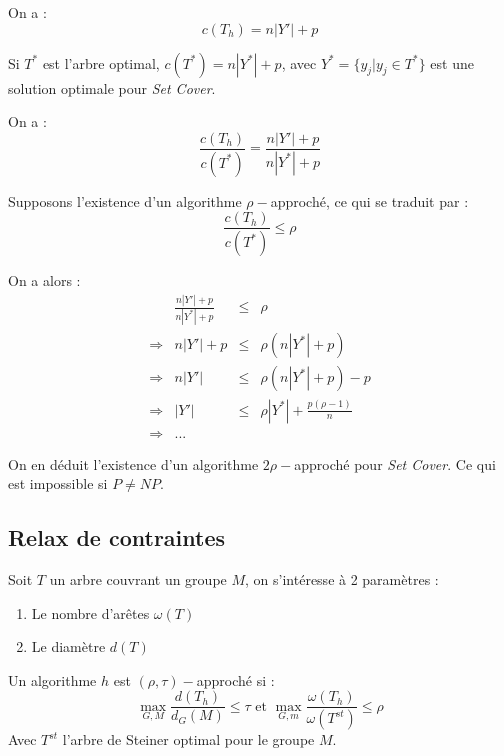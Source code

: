 \documentclass[a4paper,11pt]{thesis}
\begin{document}
On a : \begin{displaymath}
    c(T_h) = n|Y'| + p
\end{displaymath}

Si $T^*$ est l'arbre optimal, $c(T^*) = n|Y^*| + p$, avec $Y^* = \{y_j | y_j \in T^* \}$ est une
solution optimale pour \emph{Set Cover}.

On a : \begin{displaymath}
    \frac{c(T_h)}{c(T^*)} = \frac{n|Y'| + p}{n|Y^*| + p}
\end{displaymath}

Supposons l'existence d'un algorithme $\rho-$approché, ce qui se traduit par : 
\begin{displaymath}
    \frac{c(T_h)}{c(T^*)} \leq \rho
\end{displaymath}

On a alors : 
\begin{displaymath}
    \begin{array}{rrcl}
        & \displaystyle \frac{n|Y'| + p}{n|Y^*| + p} & \leq & \rho \\
        \Rightarrow & n|Y'|  + p & \leq & \rho(n |Y^*| + p) \\
        \Rightarrow & n|Y'| & \leq & \rho(n |Y^*| + p) - p \\
        \Rightarrow & |Y'| & \leq & \rho |Y^*| + \displaystyle \frac{p(\rho -1)}{n} \\
        \Rightarrow & ...
    \end{array}
\end{displaymath}

On en déduit l'existence d'un algorithme $2\rho-$approché pour \emph{Set Cover}. Ce qui est
impossible si $P \neq NP$.

\subsection{Relax de contraintes}

Soit $T$ un arbre couvrant un groupe $M$, on s'intéresse à 2 paramètres :
\begin{enumerate}
    \item Le nombre d'arêtes $\omega(T)$
    \item Le diamètre $d(T)$
\end{enumerate}

Un algorithme $h$ est $(\rho, \tau)-$approché si :
\begin{displaymath}
    \max_{G, M} \frac{d(T_h)}{d_G(M)} \leq \tau \mbox{ et } \max_{G, m}
    \frac{\omega(T_h)}{\omega(T^{st})} \leq \rho
\end{displaymath}
Avec $T^{st}$ l'arbre de Steiner optimal pour le groupe $M$.
\end{document}
